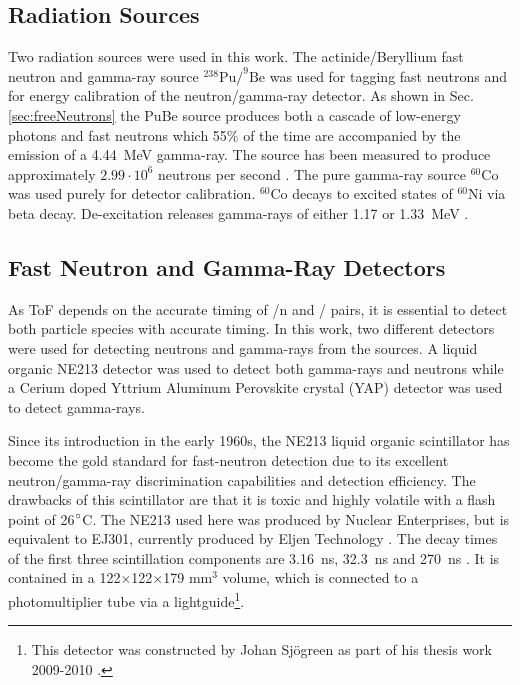 \documentclass[main.tex]{subfiles}
\begin{document}
\subsection{Radiation Sources}
Two radiation sources were used in this work. The actinide/Beryllium fast neutron and gamma-ray source $^\text{238}\text{Pu}/^\text{9}\text{Be}$ was used for tagging fast neutrons and for energy calibration of the neutron/gamma-ray detector. As shown in Sec. \ref{sec:freeNeutrons} the PuBe source produces both a cascade of low-energy photons and fast neutrons which 55\% of the time are accompanied by the emission of a \SI{4.44}{\MeV} gamma-ray. The source has been measured to produce approximately $\text{2.99}\cdot\text{10}^\text{6}$ neutrons per second \cite{Scherzinger:2017}. The pure gamma-ray source $^\text{60}\text{Co}$ was used purely for detector calibration. $^\text{60}\text{Co}$ decays to excited states of $^\text{60}\text{Ni}$ via beta decay. De-excitation releases gamma-rays of either 1.17 or \SI{1.33}{MeV} \cite{Nudat}.



\subsection{Fast Neutron and Gamma-Ray Detectors}
As ToF depends on the accurate timing of \textgamma /n and \textgamma /\textgamma\; pairs, it is essential to detect both particle species with accurate timing. In this work, two different detectors were used for detecting neutrons and gamma-rays from the sources. A liquid organic NE213 detector was used to detect both gamma-rays and neutrons while a Cerium doped Yttrium Aluminum Perovskite crystal (YAP) detector was used to detect gamma-rays. 

Since its introduction in the early 1960s, the NE213 liquid organic scintillator has become the gold standard for fast-neutron detection due to its excellent neutron/gamma-ray discrimination capabilities and detection efficiency. 
The drawbacks of this scintillator are that it is toxic and highly volatile with a flash point of 26$\text{\degree}$C. The NE213 used here was produced by Nuclear Enterprises, but is equivalent to EJ301, currently produced by Eljen Technology \cite{Eljen}. The decay times of the first three scintillation components are \SI{3.16}{ns}, \SI{32.3}{ns} and \SI{270}{ns} \cite{Eljen}. It is contained in a 122$\times$122$\times$179 \si{\mm}$^\text{3}$ volume, which is connected to a photomultiplier tube via a lightguide\footnote{This detector was constructed by Johan Sjögreen as part of his thesis work 2009-2010 \cite{sjogren}.}.
\end{document}
